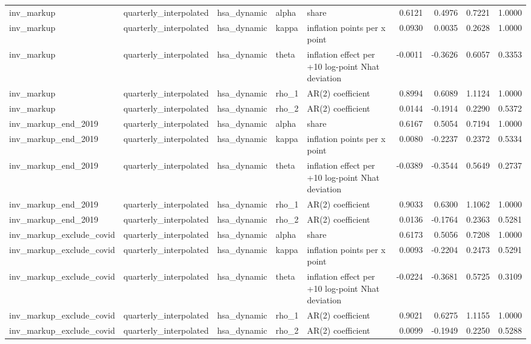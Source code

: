 \begin{tabular}{lllllrrrr}
inv\_markup & quarterly\_interpolated & hsa\_dynamic & alpha & share & 0.6121 & 0.4976 & 0.7221 & 1.0000 \\
inv\_markup & quarterly\_interpolated & hsa\_dynamic & kappa & inflation points per x point & 0.0930 & 0.0035 & 0.2628 & 1.0000 \\
inv\_markup & quarterly\_interpolated & hsa\_dynamic & theta & inflation effect per +10 log-point Nhat deviation & -0.0011 & -0.3626 & 0.6057 & 0.3353 \\
inv\_markup & quarterly\_interpolated & hsa\_dynamic & rho\_1 & AR(2) coefficient & 0.8994 & 0.6089 & 1.1124 & 1.0000 \\
inv\_markup & quarterly\_interpolated & hsa\_dynamic & rho\_2 & AR(2) coefficient & 0.0144 & -0.1914 & 0.2290 & 0.5372 \\
inv\_markup\_end\_2019 & quarterly\_interpolated & hsa\_dynamic & alpha & share & 0.6167 & 0.5054 & 0.7194 & 1.0000 \\
inv\_markup\_end\_2019 & quarterly\_interpolated & hsa\_dynamic & kappa & inflation points per x point & 0.0080 & -0.2237 & 0.2372 & 0.5334 \\
inv\_markup\_end\_2019 & quarterly\_interpolated & hsa\_dynamic & theta & inflation effect per +10 log-point Nhat deviation & -0.0389 & -0.3544 & 0.5649 & 0.2737 \\
inv\_markup\_end\_2019 & quarterly\_interpolated & hsa\_dynamic & rho\_1 & AR(2) coefficient & 0.9033 & 0.6300 & 1.1062 & 1.0000 \\
inv\_markup\_end\_2019 & quarterly\_interpolated & hsa\_dynamic & rho\_2 & AR(2) coefficient & 0.0136 & -0.1764 & 0.2363 & 0.5281 \\
inv\_markup\_exclude\_covid & quarterly\_interpolated & hsa\_dynamic & alpha & share & 0.6173 & 0.5056 & 0.7208 & 1.0000 \\
inv\_markup\_exclude\_covid & quarterly\_interpolated & hsa\_dynamic & kappa & inflation points per x point & 0.0093 & -0.2204 & 0.2473 & 0.5291 \\
inv\_markup\_exclude\_covid & quarterly\_interpolated & hsa\_dynamic & theta & inflation effect per +10 log-point Nhat deviation & -0.0224 & -0.3681 & 0.5725 & 0.3109 \\
inv\_markup\_exclude\_covid & quarterly\_interpolated & hsa\_dynamic & rho\_1 & AR(2) coefficient & 0.9021 & 0.6275 & 1.1155 & 1.0000 \\
inv\_markup\_exclude\_covid & quarterly\_interpolated & hsa\_dynamic & rho\_2 & AR(2) coefficient & 0.0099 & -0.1949 & 0.2250 & 0.5288 \\

\end{tabular}
